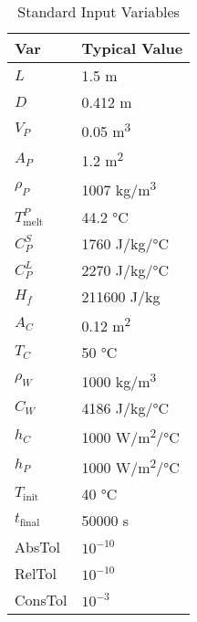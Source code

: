 \documentclass[12pt]{article}
\begin{document}
\begin{table}
\renewcommand{\arraystretch}{1.2}
\caption{Standard Input Variables} \label{TblInputVar}
~\newline
\centering
\noindent \begin{tabular}{l l} 
  \toprule
  \textbf{Var} & \textbf{Typical Value}\\
  \midrule
  $L$	& 1.5 \si[per-mode=symbol]	{\metre}
  \\
  $D$	& 0.412 \si[per-mode=symbol] {\metre}	
  \\
  $V_P$ & 0.05 \si[per-mode=symbol] {\cubic\metre}	
  \\
  $A_P$ & 1.2 \si[per-mode=symbol] {\square\metre}	
  \\
  $\rho_P$ & 1007 \si[per-mode=symbol] {\kilogram\per\cubic\metre}
  \\
  $T_\text{melt}^{P}$ &	44.2 \si[per-mode=symbol] {\celsius} 
  \\
  $C_P^S$ & 1760 \si[per-mode=symbol] {\joule\per\kilo\gram\per\celsius}
  \\
  $C_P^L$ & 2270 \si[per-mode=symbol] {\joule\per\kilo\gram\per\celsius} 
  \\
  $H_f$ & 211600 \si[per-mode=symbol] {\joule\per\kilo\gram} 
  \\
  $A_C$ & 0.12 \si[per-mode=symbol] {\square\metre}
  \\
  $T_C$	& 50 \si[per-mode=symbol] {\celsius}
  \\
  $\rho_W$ & 1000 \si[per-mode=symbol] {\kilo\gram\per\cubic\metre} 
  \\
  $C_W$ & 4186 \si[per-mode=symbol] {\joule\per\kilo\gram\per\celsius}
  \\
  $h_C$ & 1000 \si[per-mode=symbol] {\watt\per\square\metre\per\celsius}
  \\
  $h_P$ & 1000 \si[per-mode=symbol] {\watt\per\square\metre\per\celsius} 
  \\
  $T_\text{init}$ & 40 \si[per-mode=symbol] {\celsius} 
  \\
  $t_\text{final}$ & 50000 \si[per-mode=symbol] {\second} 
  \\
  AbsTol & $10^{-10}$
  \\
  RelTol & $10^{-10}$
  \\
  ConsTol & $10^{-3}$
  \\
  \bottomrule
\end{tabular}
\end{table}

\newpage
\end{document}
